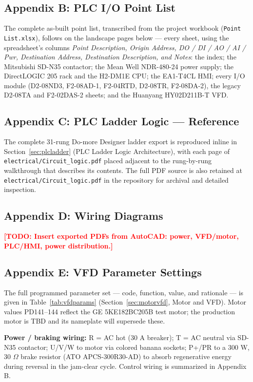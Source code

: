 \documentclass[hidelinks,12pt]{article}
\newcommand{\todo}[1]{\textcolor{red}{\textbf{[TODO: #1]}}}
\begin{document}
\subsection{Appendix B: PLC I/O Point List}
The complete as-built point list, transcribed from the project workbook
(\texttt{Point List.xlsx}), follows on the landscape pages below --- every sheet, using
the spreadsheet's columns \emph{Point Description, Origin Address, DO / DI / AO / AI /
Pwr, Destination Address, Destination Description, and Notes}: the index; the Mitsubishi
SD-N35 contactor; the Mean Well NDR-480-24 power supply; the DirectLOGIC 205 rack and
the H2-DM1E CPU; the EA1-T4CL HMI; every I/O module (D2-08ND3, F2-08AD-1, F2-04RTD,
D2-08TR, F2-08DA-2), the legacy D2-08TA and F2-02DAS-2 sheets; and the Huanyang
HY02D211B-T VFD.



\subsection{Appendix C: PLC Ladder Logic --- Reference}
\label{sec:appendix_rungs}

The complete 31-rung Do-more Designer ladder export is reproduced inline in Section~\ref{sec:plcladder} (PLC Ladder Logic Architecture), with each page of \texttt{electrical/Circuit\_logic.pdf} placed adjacent to the rung-by-rung walkthrough that describes its contents. The full PDF source is also retained at \texttt{electrical/Circuit\_logic.pdf} in the repository for archival and detailed inspection.

\subsection{Appendix D: Wiring Diagrams}
\todo{Insert exported PDFs from AutoCAD: power, VFD/motor, PLC/HMI, power distribution.}

\subsection{Appendix E: VFD Parameter Settings}
The full programmed parameter set --- code, function, value, and rationale --- is given
in Table~\ref{tab:vfdparams} (Section~\ref{sec:motorvfd}, Motor and VFD). Motor values
PD141--144 reflect the GE 5KE182BC205B test motor; the production motor is TBD and its
nameplate will supersede these.

\textbf{Power / braking wiring:} R = AC hot (30 A breaker); T = AC neutral via SD-N35
contactor; U/V/W to motor via colored banana sockets; P+/PR to a 300 W, 30 $\Omega$
brake resistor (ATO APCS-300R30-AD) to absorb regenerative energy during reversal in
the jam-clear cycle. Control wiring is summarized in Appendix B.
\end{document}
